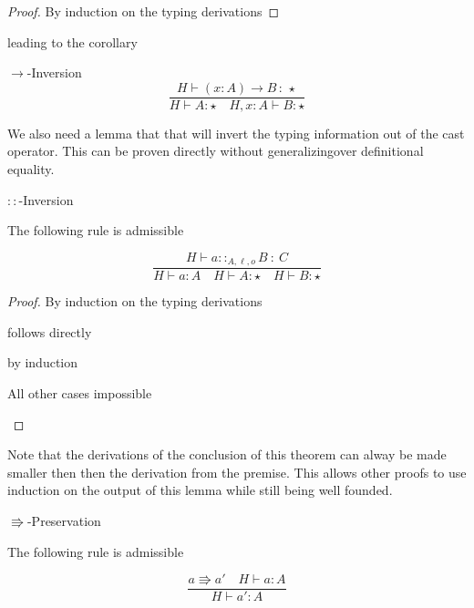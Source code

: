 \begin{proof}
By induction on the typing derivations
\end{proof}
leading to the corollary
\begin{cor}
$\rightarrow$-Inversion
\[
\frac{H\vdash\left(x:A\right)\rightarrow B\,:\,\star}{H\vdash A:\star\quad H,x:A\vdash B:\star}
\]
\end{cor}

We also need a lemma that that will invert the typing information out of the cast operator.
This can be proven directly without generalizingover definitional equality.

\begin{lem}
$::$-Inversion

The following rule is admissible
\end{lem}

\[
\frac{H\vdash a::_{A,\ell ,o}B\::\:C}{H\vdash a:A\quad H\vdash A:\star\quad H\vdash B:\star}
\]

\begin{proof}
By induction on the typing derivations

\begin{casenv}
  \item {} follows directly
  \item {} by induction
  \item All other cases impossible
 \end{casenv}
\end{proof}

Note that the derivations of the conclusion of this theorem can alway be made smaller then then the derivation from the premise.
This allows other proofs to use induction on the output of this lemma while still being well founded.

\begin{thm}
$\Rrightarrow$-Preservation 

The following rule is admissible

\[
\frac{a\Rrightarrow a'\quad H\vdash a:A}{H\vdash a':A}
\]
\end{thm}

